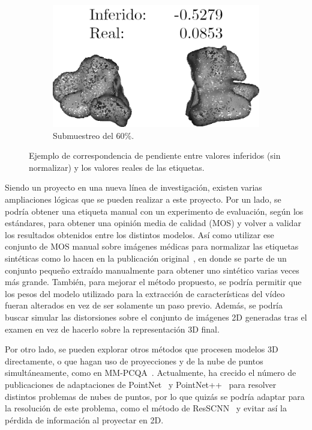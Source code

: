 \begin{figure}
  \begin{subfigure}[b]{0.31\textwidth}
  \centering
    \includegraphics[width=\textwidth]{imagenes/chapter6/Maxiliar100014_11.png}
  \caption{Submuestreo del 60\%.}
  \end{subfigure}
  \caption{Ejemplo de correspondencia de pendiente entre valores inferidos (sin normalizar) y 
  los valores reales de las etiquetas.} 
  \label{fig:Cualitativos}
\end{figure}


Siendo un proyecto en una nueva línea de investigación, existen varias ampliaciones 
lógicas que se pueden realizar a este proyecto. Por un lado, se podría 
obtener una etiqueta manual con un experimento de evaluación, según los estándares, para 
obtener una opinión media de calidad (MOS) y volver a validar los resultados obtenidos
entre los distintos modelos. Así como utilizar ese conjunto de MOS manual sobre imágenes médicas 
para normalizar las etiquetas sintéticas como lo hacen en la publicación original~\cite{ResSCNN}, 
en donde se parte de un conjunto pequeño extraído manualmente para obtener uno sintético varias 
veces más grande. También, para mejorar el método propuesto, se podría permitir 
que los pesos del modelo utilizado para la extracción de características 
del vídeo fueran alterados en vez de ser solamente un paso previo. Además, se podría buscar simular las distorsiones 
sobre el conjunto de imágenes 2D generadas tras el examen en vez de hacerlo 
sobre la representación 3D final. 

Por otro lado, se pueden explorar otros métodos que procesen modelos 3D directamente, 
o que hagan uso de proyecciones y de la nube de puntos simultáneamente, como en MM-PCQA~\cite{MM-PCQA}.
Actualmente, ha crecido el número de publicaciones de adaptaciones de PointNet~\cite{PointNet} y 
PointNet++~\cite{PointNet++} para resolver distintos problemas de nubes de puntos, 
por lo que quizás se podría adaptar para la resolución de este problema, como 
el método de ResSCNN~\cite{ResSCNN} y evitar así 
la pérdida de información al proyectar en 2D.

